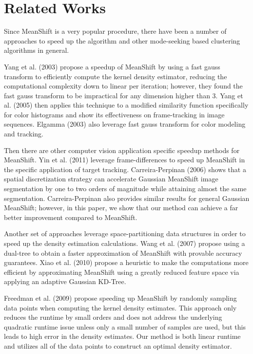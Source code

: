 \section{Related Works}

Since MeanShift is a very popular procedure, there have been a number of approaches to speed up the algorithm and other mode-seeking based clustering algorithms in general. 

Yang et al. (2003) \cite{yang2003improved} propose a speedup of MeanShift by using a fast gauss transform to efficiently compute the kernel density estimator, reducing the computational complexity down to linear per iteration; however, they found the fast gauss transform to be impractical for any dimension higher than $3$. Yang et al. (2005) \cite{yang2005efficient} then applies this technique to a modified similarity function specifically for color histograms and show its effectiveness on frame-tracking in image sequences. Elgamma (2003) \cite{elgammal2003efficient} also leverage fast gauss transform for color modeling and tracking.

Then there are other computer vision application specific speedup methods for MeanShift. Yin et al. (2011) \cite{yin2011fast} leverage frame-differences to speed up MeanShift in the specific application of target tracking. Carreira-Perpinan (2006) \cite{carreira2006acceleration} shows that a spatial discretization strategy can accelerate Gaussian MeanShift image segmentation by one to two orders of magnitude while attaining almost the same segmentation. Carreira-Perpinan \cite{carreira2006fast} also provides similar results for general Gaussian MeanShift; however, in this paper, we show that our method can achieve a far better improvement compared to MeanShift.

Another set of approaches leverage space-partitioning data structures in order to speed up the density estimation calculations. Wang et al. (2007) \cite{wang2007fast} propose using a dual-tree to obtain a faster approximation of MeanShift with provable accuracy guarantees. Xiao et al. (2010) \cite{xiao2010efficient} propose a heuristic to make the computations more efficient by approximating MeanShift using a greatly reduced feature space via applying an adaptive Gaussian KD-Tree.

Freedman et al. (2009)  \cite{freedman2009fast} propose speeding up MeanShift by randomly sampling data points when computing the kernel density estimates. This approach only reduces the runtime by small orders and does not address the underlying quadratic runtime issue unless only a small number of samples are used, but this leads to high error in the density estimates. Our method is both linear runtime and utilizes all of the data points to construct an optimal density estimator.


